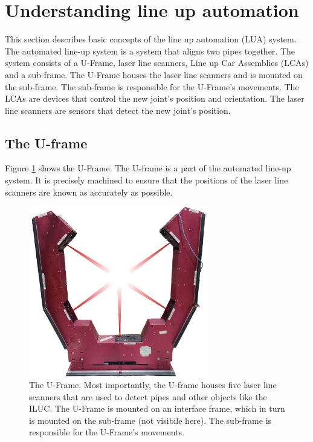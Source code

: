 \section{Understanding line up automation} \label{sec:understanding_automated_line_up}
This section describes basic concepts of the line up automation (LUA) system. The automated line-up system is a system that aligns two pipes together. The system consists of a U-Frame, laser line scanners, Line up Car Assemblies (LCAs) and a sub-frame. The U-Frame houses the laser line scanners and is mounted on the sub-frame. The sub-frame is responsible for the U-Frame's movements. The LCAs are devices that control the new joint's position and orientation. The laser line scanners are sensors that detect the new joint's position.

\subsection{The U-frame} \label{ssec:U-frame}
Figure \ref{fig:U-frame} shows the U-Frame. The U-frame is a part of the automated line-up system. It is precisely machined to ensure that the positions of the laser line scanners are known as accurately as possible.
\begin{figure}[H]
    \centering
    \includegraphics[width=0.7\textwidth]{images/u_frame_lasers.png}
    \caption{The U-Frame. Most importantly, the U-frame houses five laser line scanners that are used to detect pipes and other objects like the ILUC. The U-Frame is mounted on an interface frame, which in turn is mounted on the sub-frame (not visibile here). The sub-frame is responsible for the U-Frame's movements. }
    \label{fig:U-frame}
\end{figure}

